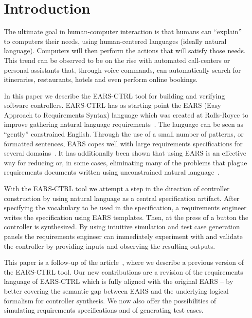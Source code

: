 \section{Introduction}

The ultimate goal in human-computer interaction is that humans can ``explain''
to computers their needs, using human-centered languages (ideally natural
language). Computers will then perform the actions that will satisfy
those needs. This trend can be observed to be on the rise with automated
call-centers or personal assistants that, through voice commands, can
automatically search for itineraries, restaurants, hotels and even perform
online bookings.

In this paper we describe the \textsf{EARS-CTRL} tool for building and verifying
software controllers. \textsf{EARS-CTRL} has as starting point the EARS (Easy
Approach to Requirements Syntax) language which was created at
Rolls-Royce to improve gathering natural language requirements~\cite{EARS09}.
The language can be seen as ``gently'' constrained English. Through the use of a
small number of patterns, or formatted sentences, EARS copes well with large requirements
specifications for several domains~\cite{EARS10,EARS16}. It has additionally
been shown that using EARS is an effective way for reducing or, in some cases,
eliminating many of the problems that plague requirements documents written
using unconstrained natural language~\cite{EARS09}.

With the \textsf{EARS-CTRL} tool we attempt a step in the direction of
controller construction by using natural language as a central specification
artifact. After specifying the vocabulary to be used in the specification, a
requirements engineer writes the specification using EARS templates. Then, at
the press of a button the controller is synthesized. By using intuitive
simulation and test case generation panels the requirements engineer can
immediately experiment with and validate the controller by providing inputs and
observing the resulting outputs.

This paper is a follow-up of the article~\cite{LucioRCM17}, where we describe a
previous version of the \textsf{EARS-CTRL} tool.
Our new contributions are a revision of the requirements language of
\textsf{EARS-CTRL} which is fully aligned with the original EARS -- by better
covering the semantic gap between EARS and the underlying logical formalism for
controller synthesis. We now also offer the possibilities of simulating 
requirements specifications and of generating test cases.


